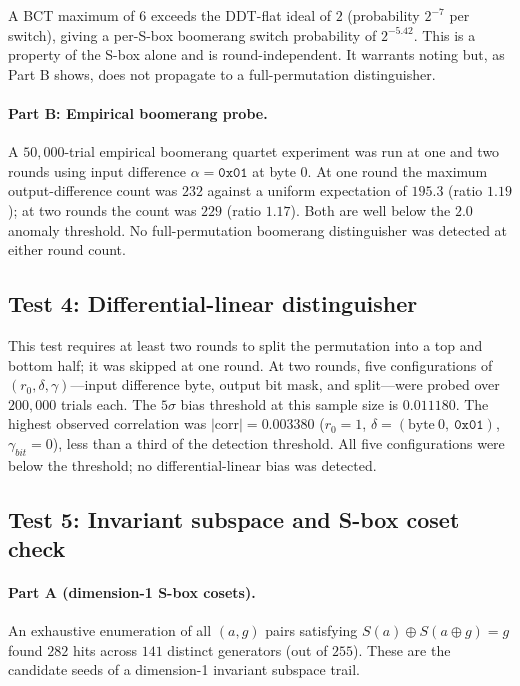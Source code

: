 \documentclass[11pt,a4paper]{article}
\begin{document}
A BCT maximum of $6$ exceeds the DDT-flat ideal of $2$ (probability
$2^{-7}$ per switch), giving a per-S-box boomerang switch probability of
$2^{-5.42}$.  This is a property of the S-box alone and is
round-independent.  It warrants noting but, as Part B shows, does not propagate
to a full-permutation distinguisher.

\paragraph{Part B: Empirical boomerang probe.}
A $50{,}000$-trial empirical boomerang quartet experiment was run at one and two
rounds using input difference $\alpha = \texttt{0x01}$ at byte $0$.  At one
round the maximum output-difference count was $232$ against a uniform expectation
of $195.3$ (ratio $1.19$); at two rounds the count was $229$ (ratio $1.17$).
Both are well below the $2.0$ anomaly threshold.  No full-permutation boomerang
distinguisher was detected at either round count.

\subsection{Test 4: Differential-linear distinguisher}

This test requires at least two rounds to split the permutation into a top and
bottom half; it was skipped at one round.  At two rounds, five configurations
of $(r_0, \delta, \gamma)$---input difference byte, output bit mask, and
split---were probed over $200{,}000$ trials each.  The $5\sigma$ bias
threshold at this sample size is $0.011180$.  The highest observed correlation
was $|$corr$| = 0.003380$ ($r_0 = 1$, $\delta = (\text{byte}~0,\
\texttt{0x01})$, $\gamma_{\mathit{bit}} = 0$), less than a third of the
detection threshold.  All five configurations were below the threshold; no
differential-linear bias was detected.

\subsection{Test 5: Invariant subspace and S-box coset check}

\paragraph{Part A (dimension-1 S-box cosets).}
An exhaustive enumeration of all $(a, g)$ pairs satisfying
$S(a) \oplus S(a \oplus g) = g$ found $282$ hits across $141$ distinct
generators (out of $255$).  These are the candidate seeds of a dimension-1
invariant subspace trail.
\end{document}
